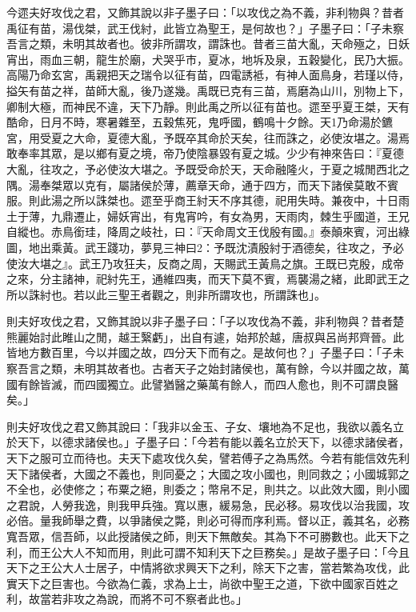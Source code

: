 \begin{pinyinscope}
今遝夫好攻伐之君，又飾其說以非子墨子曰：「以攻伐之為不義，非利物與？昔者禹征有苗，湯伐桀，武王伐紂，此皆立為聖王，是何故也？」子墨子曰：「子未察吾言之類，未明其故者也。彼非所謂攻，謂誅也。昔者三苗大亂，天命殛之，日妖宵出，雨血三朝，龍生於廟，犬哭乎巿，夏冰，地坼及泉，五穀變化，民乃大振。高陽乃命玄宮，禹親把天之瑞令以征有苗，四電誘袛，有神人面鳥身，若瑾以侍，搤矢有苗之祥，苗師大亂，後乃遂幾。禹既已克有三苗，焉磨為山川，別物上下，卿制大極，而神民不違，天下乃靜。則此禹之所以征有苗也。遝至乎夏王桀，天有酷命，日月不時，寒暑雜至，五穀焦死，鬼呼國，鶴鳴十夕餘。天1乃命湯於鑣宮，用受夏之大命，夏德大亂，予既卒其命於天矣，往而誅之，必使汝堪之。湯焉敢奉率其眾，是以鄉有夏之境，帝乃使陰暴毀有夏之城。少少有神來告曰：『夏德大亂，往攻之，予必使汝大堪之。予既受命於天，天命融隆火，于夏之城閒西北之隅。湯奉桀眾以克有，屬諸侯於薄，薦章天命，通于四方，而天下諸侯莫敢不賓服。則此湯之所以誅桀也。遝至乎商王紂天不序其德，祀用失時。兼夜中，十日雨土于薄，九鼎遷止，婦妖宵出，有鬼宵吟，有女為男，天雨肉，棘生乎國道，王兄自縱也。赤鳥銜珪，降周之岐社，曰：『天命周文王伐殷有國。』泰顛來賓，河出綠圖，地出乘黃。武王踐功，夢見三神曰2：予既沈漬殷紂于酒德矣，往攻之，予必使汝大堪之』。武王乃攻狂夫，反商之周，天賜武王黃鳥之旗。王既已克殷，成帝之來，分主諸神，祀紂先王，通維四夷，而天下莫不賓，焉襲湯之緒，此即武王之所以誅紂也。若以此三聖王者觀之，則非所謂攻也，所謂誅也」。

則夫好攻伐之君，又飾其說以非子墨子曰：「子以攻伐為不義，非利物與？昔者楚熊麗始討此睢山之閒，越王繄虧」，出自有遽，始邦於越，唐叔與呂尚邦齊晉。此皆地方數百里，今以并國之故，四分天下而有之。是故何也？」子墨子曰：「子未察吾言之類，未明其故者也。古者天子之始封諸侯也，萬有餘，今以并國之故，萬國有餘皆滅，而四國獨立。此譬猶醫之藥萬有餘人，而四人愈也，則不可謂良醫矣。」

則夫好攻伐之君又飾其說曰：「我非以金玉、子女、壤地為不足也，我欲以義名立於天下，以德求諸侯也。」子墨子曰：「今若有能以義名立於天下，以德求諸侯者，天下之服可立而待也。夫天下處攻伐久矣，譬若傅子之為馬然。今若有能信效先利天下諸侯者，大國之不義也，則同憂之；大國之攻小國也，則同救之；小國城郭之不全也，必使修之；布粟之絕，則委之；幣帛不足，則共之。以此效大國，則小國之君說，人勞我逸，則我甲兵強。寬以惠，緩易急，民必移。易攻伐以治我國，攻必倍。量我師舉之費，以爭諸侯之斃，則必可得而序利焉。督以正，義其名，必務寬吾眾，信吾師，以此授諸侯之師，則天下無敵矣。其為下不可勝數也。此天下之利，而王公大人不知而用，則此可謂不知利天下之巨務矣。」是故子墨子曰：「今且天下之王公大人士居子，中情將欲求興天下之利，除天下之害，當若繁為攻伐，此實天下之巨害也。今欲為仁義，求為上士，尚欲中聖王之道，下欲中國家百姓之利，故當若非攻之為說，而將不可不察者此也。」


\end{pinyinscope}